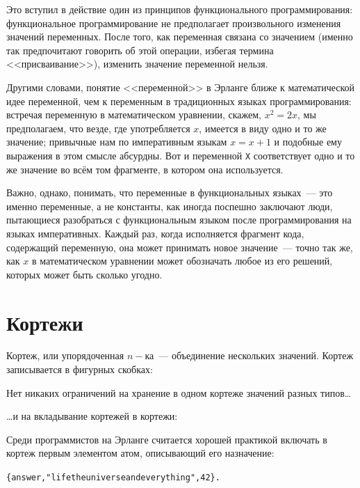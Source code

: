 \documentclass[
  paper=a4,
  fontsize=14pt,
  openany,
  appendixprefix=true
]{scrbook}
\begin{document}
\label{noAssignment}
Это вступил в действие один из принципов функционального программирования: функциональное программирование не предполагает произвольного изменения значений переменных. После того, как переменная связана со значением (именно так предпочитают говорить об этой операции, избегая термина <<присваивание>>), изменить значение переменной нельзя.


Другими словами, понятие <<переменной>> в Эрланге ближе к математической идее переменной, чем к переменным в традиционных языках программирования: встречая переменную в математическом уравнении, скажем, $x^2 = 2x$, мы предполагаем, что везде, где употребляется $x$, имеется в виду одно и то же значение; привычные нам по императивным языкам $x = x + 1$ и подобные ему выражения в этом смысле абсурдны. Вот и переменной \lstinline{X} соответствует одно и то же значение во всём том фрагменте, в котором она используется.

Важно, однако, понимать, что переменные в функциональных языках~--- это именно переменные, а не константы, как иногда поспешно заключают люди, пытающиеся разобраться с функциональным языком после программирования на языках императивных. Каждый раз, когда исполняется фрагмент кода, содержащий переменную, она может принимать новое значение~--- точно так же, как $x$ в математическом уравнении может обозначать любое из его решений, которых может быть сколько угодно.

\section{Кортежи}

Кортеж, или упорядоченная $n-$ка~--- объединение нескольких значений. Кортеж записывается в фигурных скобках:

Нет никаких ограничений на хранение в одном кортеже значений разных типов\ldots{}

\ldots{}и на вкладывание кортежей в кортежи:

Среди программистов на Эрланге считается хорошей практикой включать в кортеж первым элементом атом, описывающий его назначение:
\begin{alltt}\{answer, "life the universe and everything", 42\}.\end{alltt}
\end{document}
